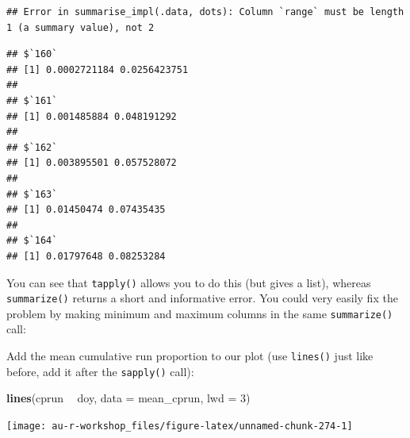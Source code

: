 \documentclass[]{book}
\newenvironment{Shaded}{\begin{snugshade}}{\end{snugshade}}
\newcommand{\KeywordTok}[1]{\textcolor[rgb]{0.13,0.29,0.53}{\textbf{#1}}}
\newcommand{\DataTypeTok}[1]{\textcolor[rgb]{0.13,0.29,0.53}{#1}}
\newcommand{\DecValTok}[1]{\textcolor[rgb]{0.00,0.00,0.81}{#1}}
\newcommand{\StringTok}[1]{\textcolor[rgb]{0.31,0.60,0.02}{#1}}
\newcommand{\CommentTok}[1]{\textcolor[rgb]{0.56,0.35,0.01}{\textit{#1}}}
\newcommand{\OperatorTok}[1]{\textcolor[rgb]{0.81,0.36,0.00}{\textbf{#1}}}
\newcommand{\NormalTok}[1]{#1}
\theoremstyle{definition}
\theoremstyle{definition}
\theoremstyle{definition}
\theoremstyle{remark}
\begin{document}
\begin{verbatim}
## Error in summarise_impl(.data, dots): Column `range` must be length 1 (a summary value), not 2
\end{verbatim}

\begin{Shaded}
\end{Shaded}

\begin{verbatim}
## $`160`
## [1] 0.0002721184 0.0256423751
## 
## $`161`
## [1] 0.001485884 0.048191292
## 
## $`162`
## [1] 0.003895501 0.057528072
## 
## $`163`
## [1] 0.01450474 0.07435435
## 
## $`164`
## [1] 0.01797648 0.08253284
\end{verbatim}

You can see that \texttt{tapply()} allows you to do this (but gives a
list), whereas \texttt{summarize()} returns a short and informative
error. You could very easily fix the problem by making minimum and
maximum columns in the same \texttt{summarize()} call:

\begin{Shaded}
\end{Shaded}

Add the mean cumulative run proportion to our plot (use \texttt{lines()}
just like before, add it after the \texttt{sapply()} call):

\begin{Shaded}
\begin{Highlighting}[]
\KeywordTok{lines}\NormalTok{(cprun }\OperatorTok{~}\StringTok{ }\NormalTok{doy, }\DataTypeTok{data =}\NormalTok{ mean_cprun, }\DataTypeTok{lwd =} \DecValTok{3}\NormalTok{)}
\end{Highlighting}
\end{Shaded}

\begin{center}\texttt{[image: au-r-workshop\_files/figure-latex/unnamed-chunk-274-1]} \end{center}
\end{document}
